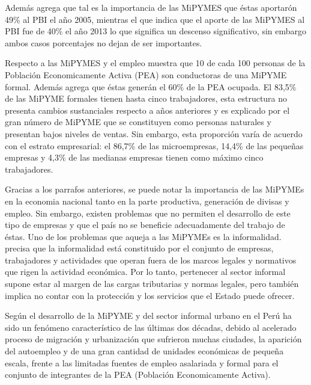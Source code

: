 Adem\'as \cite{arbulu} agrega que tal es la importancia de las MiPYMES que \'estas aportar\'on
49\% al PBI el a\~no 2005, mientras el que \citep{produce} indica que el aporte
de las MiPYMES al PBI fue de 40\% el a\~no 2013 lo que significa un descenso significativo,
sin embargo ambos casos porcentajes no dejan de ser importantes.

Respecto a las MiPYMES y el empleo \cite{produce2} muestra que 10 de cada 100 personas
de la Poblaci\'on Economicamente Activa (PEA) son conductoras de una MiPYME formal.
Adem\'as agrega que \'estas gener\'an el 60\% de la PEA ocupada. El 83,5\% de las
MiPYME formales tienen hasta cinco trabajadores, esta estructura no presenta cambios
sustanciales respecto a a\~nos anteriores y es explicado por el gran n\'umero de
MiPYME que se constituyen como personas naturales y presentan bajos niveles de
ventas. Sin embargo, esta proporci\'on var\'ia de acuerdo con el estrato empresarial:
el 86,7\% de las microempresas, 14,4\% de las peque\~nas empresas y 4,3\% de las
medianas empresas tienen como m\'aximo cinco trabajadores.

Gracias a los parrafos anteriores, se puede notar la importancia de las MiPYMEs en
la economia nacional tanto en la parte productiva, generaci\'on de divisas y empleo.
Sin embargo, existen problemas que no permiten el desarrollo de este tipo de empresas
y que el pa\'is no se beneficie adecuadamente del trabajo de \'estas. Uno de los problemas que aqueja a
las MiPYMEs es la informalidad. \cite{loayza} precisa que la informalidad est\'a
constituido por el conjunto de empresas, trabajadores y actividades que operan
fuera de los marcos legales y normativos que rigen la actividad econ\'omica. Por
lo tanto, pertenecer al sector informal supone estar al margen de las cargas
tributarias y normas legales, pero tambi\'en implica no contar con la protecci\'on
y los servicios que el Estado puede ofrecer.

Seg\'un \cite{arbulu} el desarrollo de la MiPYME y del sector informal urbano
en el Per\'u ha sido un fen\'omeno caracter\'istico de las \'ultimas dos
d\'ecadas, debido al acelerado proceso de migraci\'on y urbanizaci\'on que
sufrieron muchas ciudades, la aparici\'on del autoempleo y de una gran cantidad
de unidades econ\'omicas de peque\~na escala, frente a las limitadas fuentes
de empleo asalariada y formal para el conjunto de integrantes de la PEA (Poblaci\'on
Economicamente Activa).

